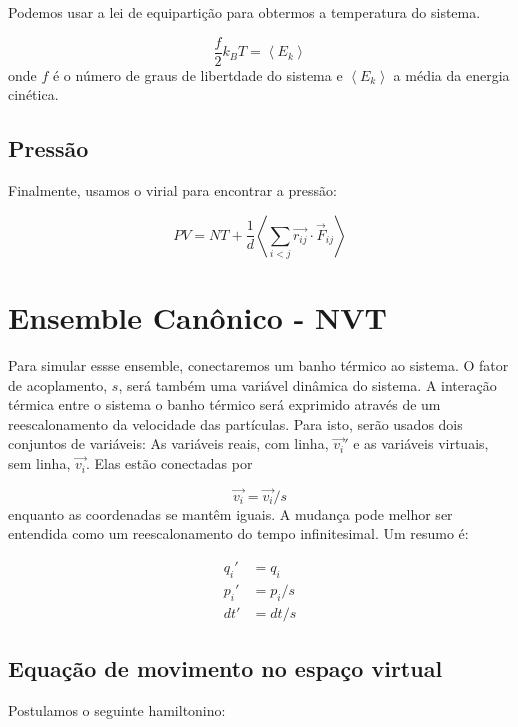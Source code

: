\documentclass[twoside, a4paper]{article}
\begin{document}
Podemos usar a lei de equipartição para obtermos a temperatura do sistema. 

\begin{equation}
	\frac{f}{2} k_B T = \left<E_k\right>
\end{equation}
onde $f$ é o número de graus de libertdade do sistema e $\left<E_k\right>$ a média da energia cinética.

\subsection{Pressão}

Finalmente, usamos o virial para encontrar a pressão:

\begin{equation}
	PV = NT + \frac{1}{d} \left<\sum_{i<j} \vec{r_{ij}} \cdot \vec{F}_{ij}\right>
\end{equation}

\section{Ensemble Canônico - NVT}

Para simular essse ensemble, conectaremos um banho térmico ao sistema. O fator de acoplamento, $s$, será também uma variável dinâmica do sistema. A interação térmica entre o sistema o banho térmico será exprimido através de um reescalonamento da velocidade das partículas. Para isto, serão usados dois conjuntos de variáveis: As variáveis reais, com linha, $\vec{v_i}'$ e as variáveis virtuais, sem linha, $\vec{v_i}$. Elas estão conectadas por

\begin{equation}
	\vec{v_i} = \vec{v_i}/s
\end{equation}
enquanto as coordenadas se mantêm iguais. A mudança pode melhor ser entendida como um reescalonamento do tempo infinitesimal. Um resumo é:

\begin{subequations}
	\begin{align}
		q_i' &= q_i \\
		p_i' &= p_i/s \\
		dt' &= dt/s
	\end{align}
\end{subequations}

\subsection{Equação de movimento no espaço virtual}
Postulamos o seguinte hamiltonino:
\end{document}
